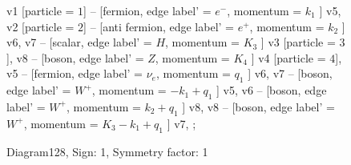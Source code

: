 \documentclass{revtex4}
\begin{document}
\begin{figure}[!htb]
\begin{center}
{    %
v1 [particle = \(1\)] -- [fermion, edge label' = \(e^{-}\), momentum = \(k_{1}\) ] v5, 
v2 [particle = \(2\)] -- [anti fermion, edge label' = \(e^{+}\), momentum = \(k_{2}\) ] v6, 
v7 -- [scalar, edge label' = \(H\), momentum = \(K_{3}\) ] v3 [particle = \(3\)], 
v8 -- [boson, edge label' = \(Z\), momentum = \(K_{4}\) ] v4 [particle = \(4\)], 
v5 -- [fermion, edge label' = \(\nu_{e}\), momentum = \(q_{1}\) ] v6, 
v7 -- [boson, edge label' = \(W^{+}\), momentum = \(-k_{1} + q_{1}\) ] v5, 
v6 -- [boson, edge label' = \(W^{+}\), momentum = \(k_{2} + q_{1}\) ] v8, 
v8 -- [boson, edge label' = \(W^{+}\), momentum = \(K_{3} - k_{1} + q_{1}\) ] v7, 
};
\end{center}
\caption{Diagram128, Sign: 1, Symmetry factor: 1}
\end{figure}
\newpage
\end{document}
